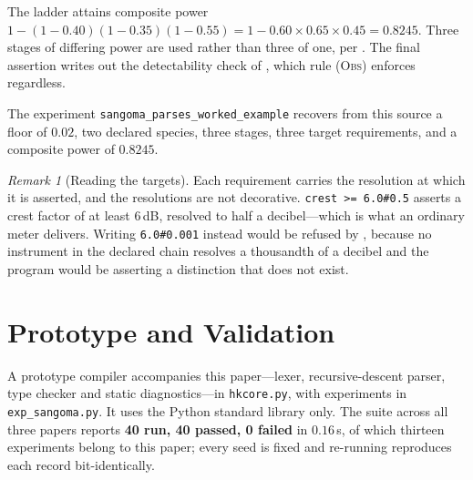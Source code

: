 \documentclass[11pt,twocolumn,a4paper]{article}
\theoremstyle{definition}
\theoremstyle{remark}
\newtheorem{remark}[theorem]{Remark}
\begin{document}
The ladder attains composite power
$1-(1-0.40)(1-0.35)(1-0.55)=1-0.60\times0.65\times0.45=0.8245$. Three stages of
differing power are used rather than three of one, per . The
final assertion writes out the detectability check of , which
rule \textsc{(Obs)} enforces regardless.

The experiment \texttt{sangoma\_parses\_worked\_example} recovers from this
source a floor of $0.02$, two declared species, three stages, three target
requirements, and a composite power of $0.8245$.

\begin{remark}[Reading the targets]
\label{rem:targets}
Each requirement carries the resolution at which it is asserted, and the
resolutions are not decorative. \texttt{crest >= 6.0\#0.5} asserts a crest factor
of at least $6$\,dB, resolved to half a decibel---which is what an ordinary meter
delivers. Writing \texttt{6.0\#0.001} instead would be refused by
, because no instrument in the declared chain resolves a
thousandth of a decibel and the program would be asserting a distinction that
does not exist.
\end{remark}

\section{Prototype and Validation}
\label{sec:validation}

A prototype compiler accompanies this paper---lexer, recursive-descent parser,
type checker and static diagnostics---in \texttt{hkcore.py}, with experiments in
\texttt{exp\_sangoma.py}. It uses the Python standard library only. The suite
across all three papers reports \textbf{40 run, 40 passed, 0 failed} in
$0.16$\,s, of which thirteen experiments belong to this paper; every seed is
fixed and re-running reproduces each record bit-identically.
\end{document}
